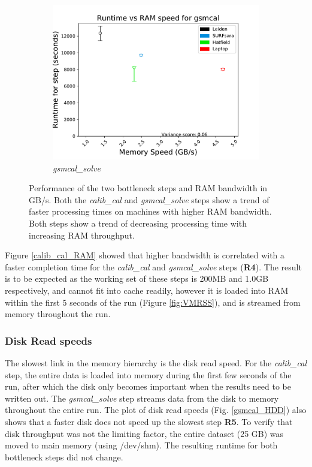 \begin{figure}
\begin{minipage}[b]{0.45\textwidth}
  \begin{subfigure}{\linewidth}
    \includegraphics[width=\textwidth]{ch4/figures/fig9/gsmcal_MEM.pdf}
      \caption{\textit{gsmcal\_solve}}
	\label{gamcal_RAM}
 \end{subfigure}
 \label{ram_bandw}
 \caption{Performance of the two bottleneck steps and RAM bandwidth in GB/s. Both the \textit{calib\_cal} and \textit{gsmcal\_solve} steps show a trend of faster processing times on machines with higher RAM bandwidth. Both steps show a trend of decreasing processing time with increasing RAM throughput.} 
\end{minipage}
\end{figure}

Figure \ref{calib_cal_RAM} showed that higher bandwidth is correlated with a faster completion time for the \textit{calib\_cal} and \textit{gsmcal\_solve} steps (\textbf{R4}). The result is to be expected as the working set of these steps is 200MB and 1.0GB respectively, and cannot fit into cache readily, however it is loaded into RAM within the first 5 seconds of the run (Figure \ref{fig:VMRSS}), and is streamed from memory throughout the run. 

\subsubsection{Disk Read speeds}

The slowest link in the memory hierarchy is the disk read speed. For the \textit{calib\_cal} step, the entire data is loaded into memory during the first few seconds of the run, after which the disk only becomes important when the results need to be written out. The \textit{gsmcal\_solve} step streams data from the disk to memory throughout the entire run.  The plot of disk read speeds (Fig. \ref{gsmcal_HDD}) also shows that a faster disk does not speed up the slowest step \textbf{R5}. To verify that disk throughput was not the limiting factor, the entire dataset (25 GB) was moved to main memory (using /dev/shm).  The resulting runtime for both bottleneck steps did not change.  

